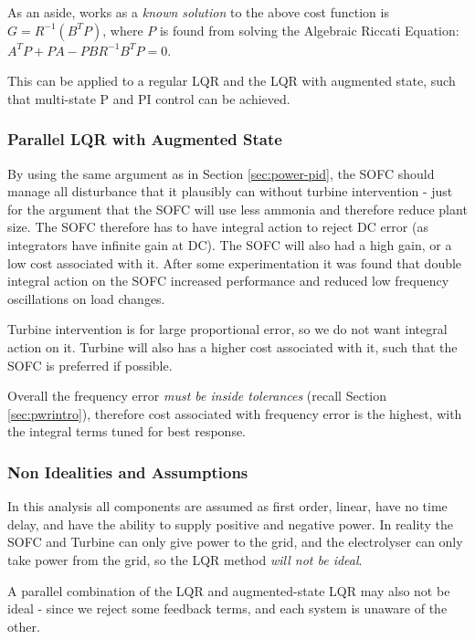 As an aside,  works as a \emph{known solution} to the above cost function is $G = R^{-1} ( B^T P)$, where $P$ is found from solving the Algebraic Riccati Equation: $A^T P + PA - PBR^{-1}B^TP = 0$. \cite{power:controlman}

This can be applied to a regular LQR and the LQR with augmented state, such that multi-state P and PI control can be achieved.

\subsubsection{Parallel LQR with Augmented State}

By using the same argument as in Section \ref{sec:power-pid}, the SOFC should manage all disturbance that it plausibly can without turbine intervention - just for the argument that the SOFC will use less ammonia and therefore reduce plant size.
The SOFC therefore has to have integral action to reject DC error (as integrators have infinite gain at DC).
The SOFC will also had a high gain, or a low cost associated with it.
After some experimentation it was found that double integral action on the SOFC increased performance and reduced low frequency oscillations on load changes.

Turbine intervention is for large proportional error, so we do not want integral action on it.
Turbine will also has a higher cost associated with it, such that the SOFC is preferred if possible.

Overall the frequency error \emph{must be inside tolerances} (recall Section \ref{sec:pwrintro}), therefore cost associated with frequency error is the highest, with the integral terms tuned for best response.


\subsubsection{Non Idealities and Assumptions}

In this analysis all components are assumed as first order, linear, have no time delay, and have the ability to supply positive and negative power.
In reality the SOFC and Turbine can only give power to the grid, and the electrolyser can only take power from the grid, so the LQR method \emph{will not be ideal}.

A parallel combination of the LQR and augmented-state LQR may also not be ideal - since we reject some feedback terms, and each system is unaware of the other.

